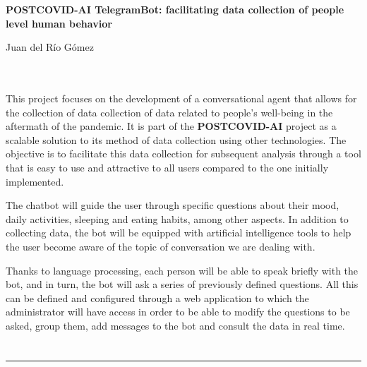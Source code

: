 \begin{center}
{\large\bfseries POSTCOVID-AI TelegramBot: facilitating data collection of people level human behavior }\\
\end{center}
\begin{center}
Juan del Río Gómez\\
\end{center}
\vspace{0.7cm}
\\

\vspace{0.7cm}
\\

This project focuses on the development of a conversational agent that allows for the collection of data
collection of data related to people's well-being in the aftermath of the pandemic. It is part of the {\bfseries POSTCOVID-AI} project as a scalable solution to its method of data collection using other technologies. The objective is to facilitate this data collection for subsequent analysis through a tool that is easy to use and attractive to all users compared to the one initially implemented.\vspace{0.3cm}

The chatbot will guide the user through specific questions about their mood, daily activities, sleeping and eating habits, among other aspects. In addition to collecting data, the bot will be equipped with artificial intelligence tools to help the user become aware of the topic of conversation we are dealing with.\vspace{0.3cm}

Thanks to language processing, each person will be able to speak briefly with the bot, and in turn, the bot will ask a series of previously defined questions. All this can be defined and configured through a web application to which the administrator will have access in order to be able to modify the questions to be asked, group them, add messages to the bot and consult the data in real time.

\chapter*{}
\thispagestyle{empty}

\noindent\rule[-1ex]{\textwidth}{2pt}\\[4.5ex]

